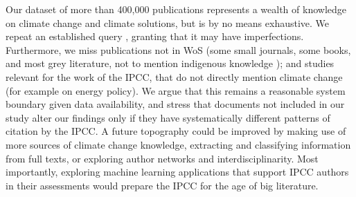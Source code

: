 \documentclass{article}
\begin{document}
\begin{linenumbers}
		Our dataset of more than 400,000 publications represents a wealth of knowledge on climate change and climate solutions, but is by no means exhaustive. We repeat an established query \cite{Haunschild2016}, granting that it may have imperfections. Furthermore, we miss publications not in WoS  (some small journals, some books, and most grey literature, not to mention indigenous knowledge \cite{Ford2016b}); and studies relevant for the work of the IPCC, that do not directly mention climate change (for example on energy policy). We argue that this remains a reasonable system boundary given data availability, and stress that documents not included in our study alter our findings only if they have systematically different patterns of citation by the IPCC. 
		A future topography could be improved by making use of more sources of climate change knowledge, extracting and classifying information from full texts, or exploring author networks and interdisciplinarity. 
		Most importantly, exploring machine learning applications that support IPCC authors in their assessments would prepare the IPCC for the age of big literature.
		
		
	\end{linenumbers}
	
	\appendix
	
	\linespread{1}
	
	
	
	
	
\end{document}
